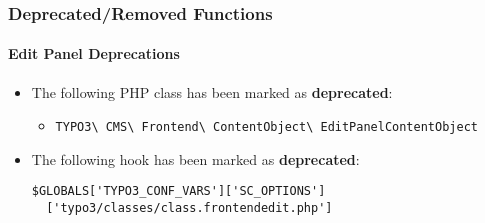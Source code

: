 %

\begin{frame}[fragile]
	\frametitle{Deprecated/Removed Functions}
	\framesubtitle{Edit Panel Deprecations}


	\begin{itemize}
		\item The following PHP class has been marked as \textbf{deprecated}:
			\begin{itemize}\smaller
				\item \texttt{TYPO3\textbackslash
					CMS\textbackslash
					Frontend\textbackslash
					ContentObject\textbackslash
					EditPanelContentObject}
			\end{itemize}\normalsize
		\item The following hook has been marked as \textbf{deprecated}:
\begin{lstlisting}
$GLOBALS['TYPO3_CONF_VARS']['SC_OPTIONS']
  ['typo3/classes/class.frontendedit.php']
\end{lstlisting}

	\end{itemize}

\end{frame}

